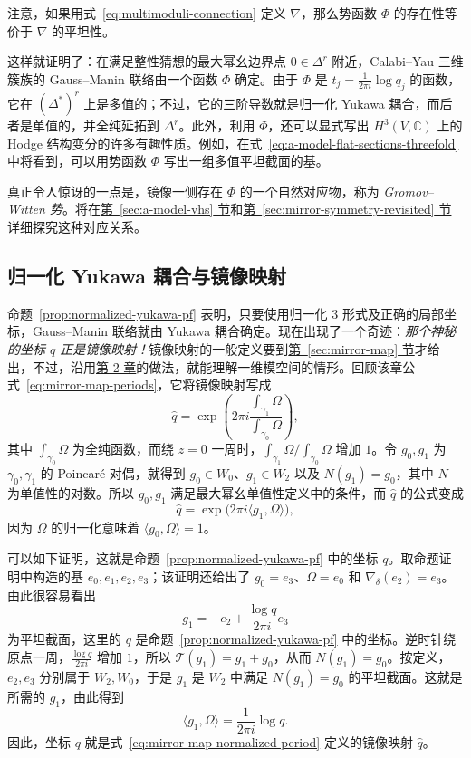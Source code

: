 注意，如果用式~\eqref{eq:multimoduli-connection} 定义 $\nabla$，那么势函数 $\Phi$ 的存在性等价于 $\nabla$ 的平坦性。

这样就证明了：在满足整性猜想的最大幂幺边界点 $0\in\Delta^r$ 附近，Calabi--Yau 三维簇族的 Gauss--Manin 联络由一个函数 $\Phi$ 确定。由于 $\Phi$ 是 $t_j=\frac1{2\pi i}\log q_j$ 的函数，它在 $(\Delta^*)^r$ 上是多值的；不过，它的三阶导数就是归一化 Yukawa 耦合，而后者是单值的，并全纯延拓到 $\Delta^r$。此外，利用 $\Phi$，还可以显式写出 $H^3(V,\mathbb C)$ 上的 Hodge 结构变分的许多有趣性质。例如，在式~\eqref{eq:a-model-flat-sections-threefold} 中将看到，可以用势函数 $\Phi$ 写出一组多值平坦截面的基。

真正令人惊讶的一点是，镜像一侧存在 $\Phi$ 的一个自然对应物，称为 \emph{Gromov--Witten 势}。将在\hyperref[sec:a-model-vhs]{第~\ref*{sec:a-model-vhs} 节}和\hyperref[sec:mirror-symmetry-revisited]{第~\ref*{sec:mirror-symmetry-revisited} 节}详细探究这种对应关系。

\subsection{归一化 Yukawa 耦合与镜像映射}\label{subsec:normalized-yukawa-mirror}
命题~\ref{prop:normalized-yukawa-pf} 表明，只要使用归一化 $3$ 形式及正确的局部坐标，Gauss--Manin 联络就由 Yukawa 耦合确定。现在出现了一个奇迹：\emph{那个神秘的坐标 $q$ 正是镜像映射！}镜像映射的一般定义要到\hyperref[sec:mirror-map]{第~\ref*{sec:mirror-map} 节}才给出，不过，沿用\hyperref[chap:quintic]{第 2 章}的做法，就能理解一维模空间的情形。回顾该章公式~\eqref{eq:mirror-map-periods}，它将镜像映射写成
\begin{equation}\label{eq:mirror-map-period-ratio}
\widehat q=\exp\left(2\pi i\frac{\int_{\gamma_1}\Omega}{\int_{\gamma_0}\Omega}\right),
\end{equation}
其中 $\int_{\gamma_0}\Omega$ 为全纯函数，而绕 $z=0$ 一周时，$\int_{\gamma_1}\Omega/\int_{\gamma_0}\Omega$ 增加 $1$。令 $g_0,g_1$ 为 $\gamma_0,\gamma_1$ 的 Poincaré 对偶，就得到 $g_0\in W_0$、$g_1\in W_2$ 以及 $N(g_1)=g_0$，其中 $N$ 为单值性的对数。所以 $g_0,g_1$ 满足最大幂幺单值性定义中的条件，而 $\widehat q$ 的公式变成
\begin{equation}\label{eq:mirror-map-normalized-period}
\widehat q=\exp\bigl(2\pi i\langle g_1,\Omega\rangle\bigr),
\end{equation}
因为 $\Omega$ 的归一化意味着 $\langle g_0,\Omega\rangle=1$。

可以如下证明，这就是命题~\ref{prop:normalized-yukawa-pf} 中的坐标 $q$。取命题证明中构造的基 $e_0,e_1,e_2,e_3$；该证明还给出了 $g_0=e_3$、$\Omega=e_0$ 和 $\nabla_\delta(e_2)=e_3$。由此很容易看出
\[
g_1=-e_2+\frac{\log q}{2\pi i}e_3
\]
为平坦截面，这里的 $q$ 是命题~\ref{prop:normalized-yukawa-pf} 中的坐标。逆时针绕原点一周，$\frac{\log q}{2\pi i}$ 增加 $1$，所以 $\mathcal T(g_1)=g_1+g_0$，从而 $N(g_1)=g_0$。按定义，$e_2,e_3$ 分别属于 $W_2,W_0$，于是 $g_1$ 是 $W_2$ 中满足 $N(g_1)=g_0$ 的平坦截面。这就是所需的 $g_1$，由此得到
\[
\langle g_1,\Omega\rangle=\frac1{2\pi i}\log q.
\]
因此，坐标 $q$ 就是式~\eqref{eq:mirror-map-normalized-period} 定义的镜像映射 $\widehat q$。

